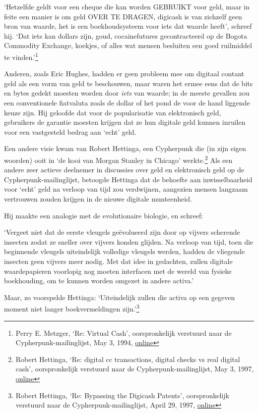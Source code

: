 \documentclass[smalldemyvopaper,11pt,twoside,onecolumn,openright,extrafontsizes,hidelinks]{memoir}
\begin{document}
`Hetzelfde geldt voor een cheque die kan worden GEBRUIKT voor geld, maar
in feite een manier is om geld OVER TE DRAGEN, digicash is van zichzelf
geen bron van waarde, het is een boekhoudsysteem voor iets dat waarde
heeft', schreef hij. `Dat iets kan dollars zijn, goud, cocainefutures
gecontracteerd op de Bogota Commodity Exchange, koekjes, of alles wat
mensen besluiten een goed ruilmiddel te vinden.'\footnote{Perry E.
  Metzger, `Re: Virtual Cash', oorspronkelijk verstuurd naar de
  Cypherpunk-mailinglijst, May 3, 1994,
  \href{https://cypherpunks.venona.com/date/1994/05/msg00131.html}{online}}

Anderen, zoals Eric Hughes, hadden er geen probleem mee om digitaal
contant geld als een vorm van geld te beschouwen, maar waren het ermee
eens dat de bits en bytes gedekt moesten worden door \emph{iets} van
waarde; in de meeste gevallen zou een conventionele fiatvaluta zoals de
dollar of het pond de voor de hand liggende keuze zijn. Hij geloofde dat
voor de popularisatie van elektronisch geld, gebruikers de garantie
moesten krijgen dat ze hun digitale geld kunnen inruilen voor een
vastgesteld bedrag aan `echt' geld.

Een andere visie kwam van Robert Hettinga, een Cypherpunk die (in zijn
eigen woorden) ooit in `de kooi van Morgan Stanley in Chicago'
werkte.\footnote{Robert Hettinga, `Re: digital cc transactions, digital
  checks vs real digital cash', oorspronkelijk verstuurd naar de
  Cypherpunk-mailinglijst, May 3, 1997,
  \href{https://cypherpunks.venona.com/date/1997/05/msg00147.html}{online}}
Als een andere zeer actieve deelnemer in discussies over geld en
elektronisch geld op de Cypherpunk-mailinglijst, betoogde Hettinga dat
de behoefte aan inwisselbaarheid voor `echt' geld na verloop van tijd
zou verdwijnen, aangezien mensen langzaam vertrouwen zouden krijgen in
de nieuwe digitale munteenheid.

Hij maakte een analogie met de evolutionaire biologie, en schreef:

`Vergeet niet dat de eerste vleugels geëvolueerd zijn door op vijvers
scherende insecten zodat ze sneller over vijvers konden glijden. Na
verloop van tijd, toen die beginnende vleugels uiteindelijk volledige
vleugels werden, hadden de vliegende insecten geen vijvers meer nodig.
Met dat idee in gedachten, zullen digitale waardepapieren voorlopig nog
moeten interfacen met de wereld van fysieke boekhouding, om te kunnen
worden omgezet in andere activa.'

Maar, zo voorspelde Hettinga: `Uiteindelijk zullen die activa op een
gegeven moment niet langer boekvermeldingen zijn.'\footnote{Robert
  Hettinga, `Re: Bypassing the Digicash Patents', oorspronkelijk
  verstuurd naar de Cypherpunk-mailinglijst, April 29, 1997,
  \href{https://cypherpunks.venona.com/date/1997/04/msg00811.html}{online}}
\end{document}
